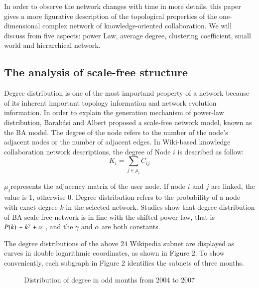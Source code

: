 \documentclass{elsarticle}
\begin{document}
In order to observe the network changes with time in more details,
this paper gives a more figurative description of the topological
properties of the one-dimensional complex network of
knowledge-oriented collaboration. We will discuss from five aspects: power Law, average degree, clustering coefficient, small world and hierarchical network.

\subsection{The analysis of scale-free structure}
\label{sec:analysis-scale-free}

Degree distribution is one of the most
importand peoperty of a network because of its inherent important topology information and network evolution information. In order to explain the generation mechanism of power-law distribution, Barabási and Albert proposed a scale-free network model, known as the BA model\cite{barabasi1999esr}.  The degree of the node refers to the number of the node's adjacent nodes or the number of adjacent edges. In Wiki-based knowledge collaboration network descriptions, the degree of Node $i$ is described as follow: 
\begin{equation}
  K_i=\sum_{j\in\mu_i}C_{ij}
\end{equation}

$\mu_j$represents the adjacency matrix of the user node. If node $i$
and $j$ are linked, the value  is 1, otherwise 0. Degree distribution
refers to the probability of a node with exact degree $k$ in the
selected network. Studies show that degree distribution of BA
scale-free network is in line with the shifted power-law, that is
$P(k)\thicksim k^\gamma+\alpha$  , and the $\gamma$ and $\alpha$ are both
constants. 


The degree distributions of the above 24 Wikipedia subnet are
displayed as curves in double logarithmic coordinates, as shown in
Figure 2. To show conveniently, each subgraph in Figure 2 identifies
the subnets of three months.
\begin{figure}[htpb]
  \centering
  \subfigure[ ]{
     \scalebox{0.18}{\texttt{[image: 02-1]}}
   } \quad
  \subfigure[ ]{ 
       \scalebox{0.18}{\texttt{[image: 02-2]}}
   } 
   
    \subfigure[ ]{
     \scalebox{0.18}{\texttt{[image: 02-3]}}
   } \quad
  \subfigure[ ]{ 
       \scalebox{0.18}{\texttt{[image: 02-4]}}
   } 
  
    \subfigure[ ]{
     \scalebox{0.18}{\texttt{[image: 02-5]}}
   } \quad
  \subfigure[ ]{ 
       \scalebox{0.18}{\texttt{[image: 02-6]}}
   } 

    \subfigure[ ]{
     \scalebox{0.18}{\texttt{[image: 02-7]}}
   } \quad
  \subfigure[ ]{ 
       \scalebox{0.18}{\texttt{[image: 02-8]}}
   } 
   \caption{Distribution of degree in odd months from 2004 to 2007}
\end{figure}
\end{document}
